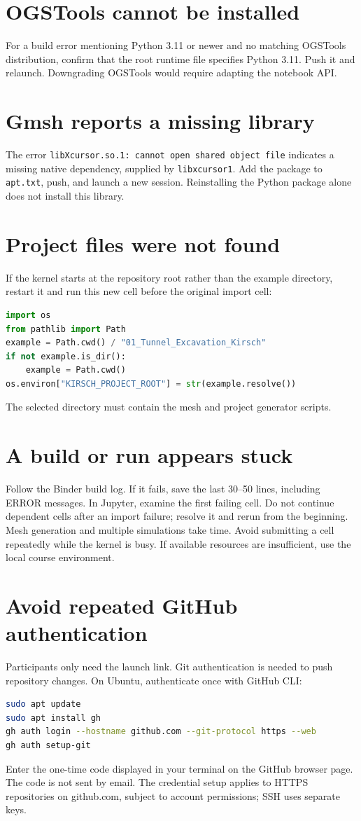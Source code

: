 \documentclass[11pt,a4paper]{tubaf-report}
\begin{document}
\section{OGSTools cannot be installed}
For a build error mentioning Python 3.11 or newer and no matching OGSTools distribution, confirm that the root runtime file specifies Python 3.11. Push it and relaunch. Downgrading OGSTools would require adapting the notebook API.
\section{Gmsh reports a missing library}
The error \texttt{libXcursor.so.1: cannot open shared object file} indicates a missing native dependency, supplied by \texttt{libxcursor1}. Add the package to \texttt{apt.txt}, push, and launch a new session. Reinstalling the Python package alone does not install this library.
\section{Project files were not found}
If the kernel starts at the repository root rather than the example directory, restart it and run this new cell before the original import cell:
\begin{lstlisting}[language=Python]
import os
from pathlib import Path
example = Path.cwd() / "01_Tunnel_Excavation_Kirsch"
if not example.is_dir():
    example = Path.cwd()
os.environ["KIRSCH_PROJECT_ROOT"] = str(example.resolve())
\end{lstlisting}
The selected directory must contain the mesh and project generator scripts.
\section{A build or run appears stuck}
Follow the Binder build log. If it fails, save the last 30--50 lines, including ERROR messages. In Jupyter, examine the first failing cell. Do not continue dependent cells after an import failure; resolve it and rerun from the beginning. Mesh generation and multiple simulations take time. Avoid submitting a cell repeatedly while the kernel is busy. If available resources are insufficient, use the local course environment.
\section{Avoid repeated GitHub authentication}
Participants only need the launch link. Git authentication is needed to push repository changes. On Ubuntu, authenticate once with GitHub CLI:
\begin{lstlisting}[language=bash]
sudo apt update
sudo apt install gh
gh auth login --hostname github.com --git-protocol https --web
gh auth setup-git
\end{lstlisting}
Enter the one-time code displayed in your terminal on the GitHub browser page. The code is not sent by email. The credential setup applies to HTTPS repositories on github.com, subject to account permissions; SSH uses separate keys.
\end{document}
